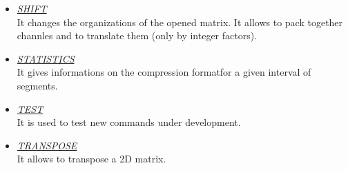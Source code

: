 \begin{itemize}
 \item	{\it\underline{SHIFT}} \\
	
	It changes the organizations of the opened matrix. It allows to pack
	together channles and to translate them (only by integer factors).

 \item	{\it\underline{STATISTICS}} \\
	
	It gives informations on the compression formatfor a given interval of
	segments.
 
 \item	{\it\underline{TEST}}\\
 
	It is used to test new commands under development.

 \item	{\it\underline{TRANSPOSE}} \\

	It allows to transpose a 2D matrix.

\end{itemize}


